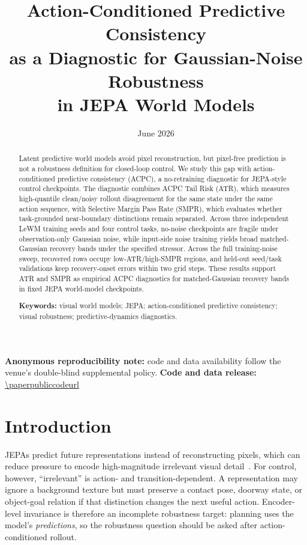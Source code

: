 \documentclass[10pt]{article}
\title{\textbf{Action-Conditioned Predictive Consistency\\as a Diagnostic for Gaussian-Noise Robustness\\in JEPA World Models}}
\author{\paperauthors}
\date{June 2026}
\begin{document}
\maketitle

\begin{abstract}
Latent predictive world models avoid pixel reconstruction, but pixel-free prediction is not a robustness definition for closed-loop control. We study this gap with action-conditioned predictive consistency (ACPC), a no-retraining diagnostic for JEPA-style control checkpoints. The diagnostic combines ACPC Tail Risk (ATR), which measures high-quantile clean/noisy rollout disagreement for the same state under the same action sequence, with Selective Margin Pass Rate (SMPR), which evaluates whether task-grounded near-boundary distinctions remain separated. Across three independent LeWM training seeds and four control tasks, no-noise checkpoints are fragile under observation-only Gaussian noise, while input-side noise training yields broad matched-Gaussian recovery bands under the specified stressor. Across the full training-noise sweep, recovered rows occupy low-ATR/high-SMPR regions, and held-out seed/task validations keep recovery-onset errors within two grid steps. These results support ATR and SMPR as empirical ACPC diagnostics for matched-Gaussian recovery bands in fixed JEPA world-model checkpoints.

\smallskip
\noindent\textbf{Keywords:} visual world models; JEPA; action-conditioned predictive consistency; visual robustness; predictive-dynamics diagnostics.
\end{abstract}

\smallskip
\ifdefined\blindsubmission
\noindent\textbf{Anonymous reproducibility note:} code and data availability follow the venue's double-blind supplemental policy.
\else
\noindent\textbf{Code and data release:} \url{\paperpubliccodeurl}
\fi

\section{Introduction}\label{sec:intro}

JEPAs predict future representations instead of reconstructing pixels, which can reduce pressure to encode high-magnitude irrelevant visual detail~\cite{assran2023ijepa,bardes2024vjepa,vanassel2025jointembeddingreconstruction}. For control, however, ``irrelevant'' is action- and transition-dependent. A representation may ignore a background texture but must preserve a contact pose, doorway state, or object-goal relation if that distinction changes the next useful action. Encoder-level invariance is therefore an incomplete robustness target: planning uses the model's \emph{predictions}, so the robustness question should be asked after action-conditioned rollout.
\end{document}
